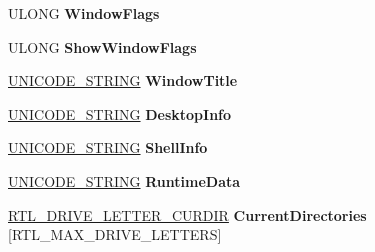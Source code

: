 \begin{DoxyCompactItemize}
U\+L\+O\+NG {\bfseries Window\+Flags}
\item 
\mbox{\label{struct___r_t_l___u_s_e_r___p_r_o_c_e_s_s___p_a_r_a_m_e_t_e_r_s_a999ce2a810e46ae557cca5412fc941b7}} 
U\+L\+O\+NG {\bfseries Show\+Window\+Flags}
\item 
\mbox{\label{struct___r_t_l___u_s_e_r___p_r_o_c_e_s_s___p_a_r_a_m_e_t_e_r_s_ac1e376e8c63adb0c22adc556206bf26d}} 
\hyperlink{struct___u_n_i_c_o_d_e___s_t_r_i_n_g}{U\+N\+I\+C\+O\+D\+E\+\_\+\+S\+T\+R\+I\+NG} {\bfseries Window\+Title}
\item 
\mbox{\label{struct___r_t_l___u_s_e_r___p_r_o_c_e_s_s___p_a_r_a_m_e_t_e_r_s_ad9199171f650b4392c91d8d2f38b8614}} 
\hyperlink{struct___u_n_i_c_o_d_e___s_t_r_i_n_g}{U\+N\+I\+C\+O\+D\+E\+\_\+\+S\+T\+R\+I\+NG} {\bfseries Desktop\+Info}
\item 
\mbox{\label{struct___r_t_l___u_s_e_r___p_r_o_c_e_s_s___p_a_r_a_m_e_t_e_r_s_ac3565c91e1e190c449e1b5de8d14acac}} 
\hyperlink{struct___u_n_i_c_o_d_e___s_t_r_i_n_g}{U\+N\+I\+C\+O\+D\+E\+\_\+\+S\+T\+R\+I\+NG} {\bfseries Shell\+Info}
\item 
\mbox{\label{struct___r_t_l___u_s_e_r___p_r_o_c_e_s_s___p_a_r_a_m_e_t_e_r_s_a0e27bdf08f330183d8875b943bf72a02}} 
\hyperlink{struct___u_n_i_c_o_d_e___s_t_r_i_n_g}{U\+N\+I\+C\+O\+D\+E\+\_\+\+S\+T\+R\+I\+NG} {\bfseries Runtime\+Data}
\item 
\mbox{\label{struct___r_t_l___u_s_e_r___p_r_o_c_e_s_s___p_a_r_a_m_e_t_e_r_s_a76f0959d007bb75906c8ef87436de85d}} 
\hyperlink{struct_r_t_l___d_r_i_v_e___l_e_t_t_e_r___c_u_r_d_i_r}{R\+T\+L\+\_\+\+D\+R\+I\+V\+E\+\_\+\+L\+E\+T\+T\+E\+R\+\_\+\+C\+U\+R\+D\+IR} {\bfseries Current\+Directories} \mbox{[}R\+T\+L\+\_\+\+M\+A\+X\+\_\+\+D\+R\+I\+V\+E\+\_\+\+L\+E\+T\+T\+E\+RS\mbox{]}
\item 
\mbox{\label{struct___r_t_l___u_s_e_r___p_r_o_c_e_s_s___p_a_r_a_m_e_t_e_r_s_a4144154e4a6833e79c7968683f08c6bc}} 

\end{DoxyCompactItemize}
